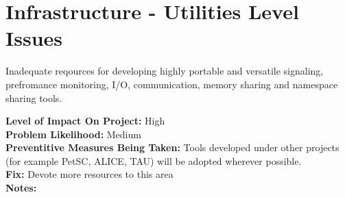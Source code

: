 \documentclass[english]{article}
\newcommand{\req}[1]{\section{\hspace{.2in}#1}}
\newenvironment
{reqlist}
{\begin{list} {} {} \rm \item[]}
{\end{list}}
\begin{document}
\req{Infrastructure - Utilities Level Issues}
Inadequate reqources for developing highly portable and versatile
signaling, prefromance monitoring, I/O, communication, memory sharing and namespace sharing tools.
\begin{reqlist}
{\bf Level of Impact On Project:} High \\
{\bf Problem Likelihood:} Medium \\
{\bf Preventitive Measures Being Taken:} Tools developed under other projects (for example PetSC, ALICE, TAU)
will be adopted wherever possible.
\\
{\bf Fix:} Devote more resources to this area \\
{\bf Notes:} 
\end{reqlist}
\end{document}
